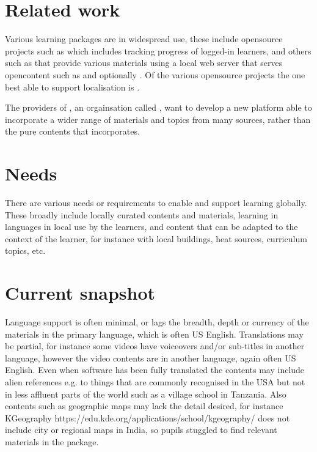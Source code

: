 \documentclass[11pt]{IEEEtran}
\begin{document}


\section*{Related work}
Various learning packages are in widespread use, these include opensource projects such as \cite{kalite} which includes tracking progress of logged-in learners, and others such as \cite{rachel} that provide various materials using a local web server that serves opencontent such as \cite{wikipedia-for-schools} and optionally \cite{kalite}. Of the various opensource projects the one best able to support localisation is \cite{kalite}. 

The providers of \cite{kalite}, an orgainsation called \cite{learning-equality}, want to develop a new platform able to incorporate a wider range of materials and topics from many sources, rather than the pure \cite{khanacademy} contents that \cite{kalite} incorporates.

\section*{Needs}
There are various needs or requirements to enable and support learning globally. These broadly include locally curated contents and materials, learning in languages in local use by the learners, and content that can be adapted to the context of the learner, for instance with local buildings, heat sources, curriculum topics, etc. 

\section*{Current snapshot}
Language support is often minimal, or lags the breadth, depth or currency of the materials in the primary language, which is often US English. Translations may be partial, for instance some videos have voiceovers and/or sub-titles in another language, however the video contents are in another language, again often US English. Even when software has been fully translated the contents may include alien references e.g. to things that are commonly recognised in the USA but not in less affluent parts of the world such as a village school in Tanzania. Also contents such as geographic maps may lack the detail desired, for instance KGeography https://edu.kde.org/applications/school/kgeography/ does not include city or regional maps in India, so pupils stuggled to find relevant materials in the package.
\end{document}
